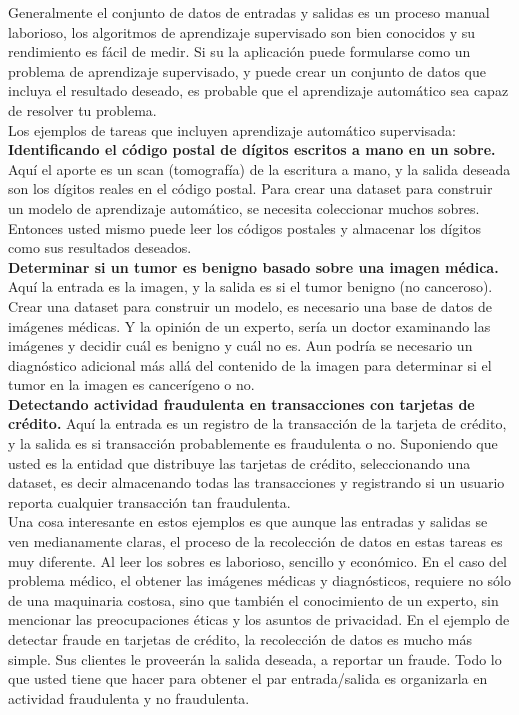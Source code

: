 Generalmente el conjunto de datos de entradas y salidas es un proceso manual laborioso, los algoritmos  de aprendizaje supervisado son bien conocidos y su rendimiento es fácil de medir.  Si su la aplicación puede formularse como un problema de aprendizaje supervisado, y puede crear un conjunto de datos que incluya el resultado deseado, es probable que el aprendizaje automático sea capaz de resolver tu problema.\\


Los ejemplos de tareas que incluyen aprendizaje automático supervisada:\\  %


{\bf{Identificando el código postal de dígitos escritos a mano en un sobre.}}
Aquí el aporte es un scan (tomografía) de la escritura a mano, y la salida deseada son los dígitos reales en el código postal. Para crear una dataset para construir un modelo de aprendizaje automático, se necesita coleccionar muchos sobres. Entonces usted mismo puede leer los códigos postales y  almacenar los dígitos como sus resultados deseados.\\


{\bf{Determinar si un tumor es benigno basado sobre una imagen médica.}}
Aquí la entrada es la imagen, y la salida es si el tumor  benigno (no canceroso). Crear una dataset para construir un modelo, es necesario una base de datos de imágenes médicas. Y la opinión de un experto, sería un doctor examinando las imágenes y decidir cuál es benigno y cuál no es. Aun podría se necesario un diagnóstico adicional más allá del contenido de la imagen para determinar si el tumor en la imagen es cancerígeno o no.\\


{\bf{Detectando actividad fraudulenta en  transacciones con tarjetas de crédito.}}
Aquí la entrada es un registro de la transacción de la tarjeta de crédito, y la salida es si  transacción  probablemente es fraudulenta o no. Suponiendo que usted es la entidad que distribuye las tarjetas de crédito, seleccionando una dataset, es decir almacenando todas las transacciones y registrando si un usuario reporta cualquier transacción tan fraudulenta.\\


Una cosa interesante en  estos ejemplos es que aunque las entradas y  salidas se ven medianamente claras, el proceso de la recolección de datos en estas  tareas es muy diferente. Al leer los sobres es laborioso,  sencillo y económico. En el caso del problema médico, el obtener las imágenes médicas y diagnósticos,  requiere no sólo de una maquinaria costosa, sino que también el conocimiento de un experto, sin mencionar las preocupaciones éticas y los asuntos de privacidad. En el ejemplo de detectar fraude en tarjetas de crédito, la recolección de datos es mucho más simple. Sus clientes le proveerán la salida deseada, a reportar un fraude. Todo lo que usted tiene que hacer para obtener el par entrada/salida es organizarla en actividad fraudulenta y no fraudulenta.\\

